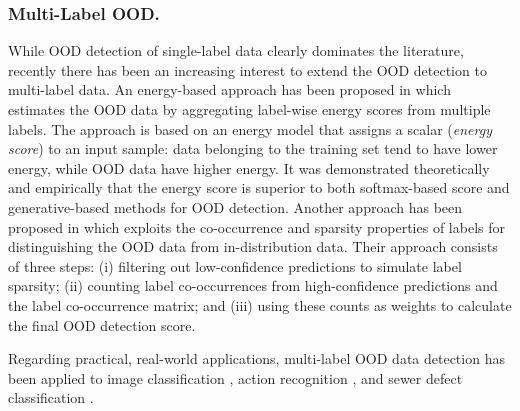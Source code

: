 \subsubsection{Multi-Label OOD.}
While OOD detection of single-label data clearly dominates the literature, recently there has been an increasing interest to extend the OOD detection to multi-label data. An energy-based approach has been proposed in \cite{wang2021neurips} which estimates the OOD data by aggregating label-wise energy scores
from multiple labels. The approach is based on an energy model that assigns a scalar ({\it energy score}) to an input sample: data belonging to the training set tend to have lower energy, while OOD data have higher energy. It was demonstrated theoretically and empirically that the energy score is superior to both softmax-based score and
generative-based methods for OOD detection. 
Another approach has been proposed in \cite{wang2022ivc} which exploits the co-occurrence and sparsity properties of labels for distinguishing the OOD data from in-distribution data. Their approach consists of three steps: (i) filtering out low-confidence predictions to simulate label sparsity; (ii) counting label co-occurrences from high-confidence predictions and the label co-occurrence matrix; and (iii) using these counts as weights to calculate the final OOD detection score.

Regarding practical, real-world applications, multi-label OOD data detection has been applied to image classification \cite{hendrycks2022icml}, action recognition \cite{zhao2023open}, and sewer defect classification \cite{zhao2023towards}.